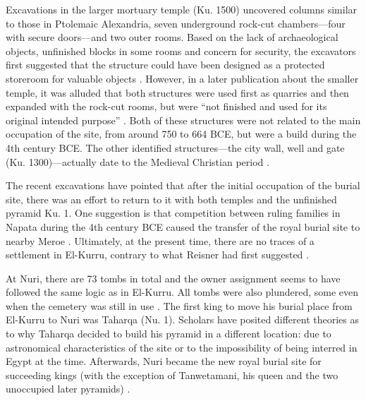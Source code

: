 Excavations in the larger mortuary temple (Ku. 1500) uncovered columns similar to those in Ptolemaic Alexandria, seven underground rock-cut chambers---four with secure doors---and two outer rooms. Based on the lack of archaeological objects, unfinished blocks in some rooms and concern for security, the excavators first suggested that the structure could have been designed as a protected storeroom for valuable objects \parencites{chengFivesidedCorinthianCapitals2013}[p.~65-67]{emberlingExcavationPyramidKu2015}{karbergRemarksStonemasonsMarks2015}. However, in a later publication about the smaller temple, it was alluded that both structures were used first as quarries and then expanded with the rock-cut rooms, but were “not finished and used for its original intended purpose” \parencites[p.~38-39]{anstisLateNapatanRockcut2016}. Both of these structures were not related to the main occupation of the site, from around 750 to 664 BCE, but were a build during the 4th century BCE. The other identified structures---the city wall, well and gate (Ku. 1300)---actually date to the Medieval Christian period \parencites[p.~43-44]{emberlingNewExcavationsElKurru2013}{skuldbølMedievalFortificationSettlement2016}.


The recent excavations have pointed that after the initial occupation of the burial site, there was an effort to return to it with both temples and the unfinished pyramid Ku. 1. One suggestion is that competition between ruling families in Napata during the 4th century BCE caused the transfer of the royal burial site to nearby Meroe \parencites{emberlingExcavationPyramidKu2015}. Ultimately, at the present time, there are no traces of a settlement in El-Kurru, contrary to what Reisner had first suggested \parencites[p.~68]{emberlingNewFindsTwentyFifth2021}.


At Nuri, there are 73 tombs in total and the owner assignment seems to have followed the same logic as in El-Kurru. All tombs were also plundered, some even when the cemetery was still in use \parencites[p.~4]{dunhamNuri1955}. The first king to move his burial place from El-Kurru to Nuri was Taharqa (Nu. 1). Scholars have posited different theories as to why Taharqa decided to build his pyramid in a different location: due to astronomical characteristics of the site or to the impossibility of being interred in Egypt at the time. Afterwards, Nuri became the new royal burial site for succeeding kings (with the exception of Tanwetamani, his queen and the two unoccupied later pyramids) \parencites{kendallWhyDidTaharqa2008, lohwasserDoublingDoubleKingdom2019}.


